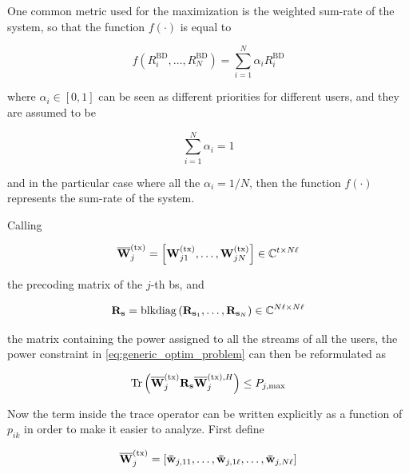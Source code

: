 One common metric used for the maximization is the weighted sum-rate of the
system, so that the function $f\left(\cdot\right)$ is equal to

\begin{equation} \label{eq:weighted_sum_rate}
    f\left(R_i^{\text{BD}}, \ldots, R_N^{\text{BD}}\right) =
    \sum\limits_{i = 1}^{N}\alpha_i R_i^{\text{BD}}
\end{equation}

\noindent
where $\alpha_i \in \left[0, 1\right]$ can be seen as different priorities for
different users, and they are assumed to be

\begin{equation} \label{eq:priorities}
    \sum\limits_{i = 1}^{N}\alpha_i = 1
\end{equation}

\noindent
and in the particular case where all the $\alpha_i = 1/N$, then the function
$f\left(\cdot\right)$ represents the sum-rate of the system.

Calling

\begin{equation} \label{eq:precoding_bs}
	\mathbf{\overline{W}}^{(\text{tx})}_j = \left[\mathbf{W}^{(\text{tx})}_{j1}, \ldots, \mathbf{W}^{(\text{tx})}_{jN}\right] \in \mathbb{C}^{t \times
	N\ell}
\end{equation}

\noindent
the precoding matrix of the $j$-th \gls{bs}, and

\begin{equation} \label{eq:powers_all_users}
	\mathbf{R}_{\mathbf{s}} = \operatorname*{blkdiag} \left(\mathbf{R}_{\mathbf{s}_1}, \ldots, \mathbf{R}_{\mathbf{s}_N}\right) \in
	\mathbb{C}^{N\ell \times N\ell}
\end{equation}

\noindent
the matrix containing the power assigned to all the streams of all the users,
the power constraint in \eqref{eq:generic_optim_problem} can then be
reformulated as

\begin{equation} \label{eq:pbpc_constraint}
	\operatorname*{Tr} \left( \mathbf{\overline{W}}^{(\text{tx})}_j\mathbf{R}_{\mathbf{s}}\mathbf{\overline{W}}^{(\text{tx}),H}_j \right) \leq P_{j,\max}
\end{equation}

Now the term inside the trace operator can be written explicitly as a function
of $p_{ik}$ in order to make it easier to analyze. First define

\begin{equation} \label{eq:precoding_bs_columns}
	\mathbf{\overline{W}}^{(\text{tx})}_j = \left[ \mathbf{\bar{w}}_{j,11}, \ldots, \mathbf{\bar{w}}_{j, 1\ell}, \ldots,
	\mathbf{\bar{w}}_{j,N\ell} \right]
\end{equation}

